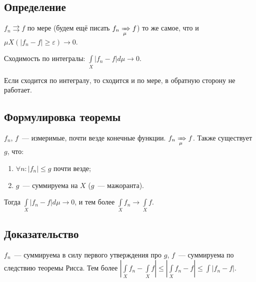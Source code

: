 \documentclass{article}
\begin{document}
        \subsection{Определение}
        
            $f_n \rightrightarrows f$ по мере (будем ещё писать $f_n \xRightarrow[\mu]{} f$) то же самое, что и $\mu X( |f_n - f| \geqslant \varepsilon) \rightarrow 0$. 
            
            Сходимость по интегралы: $\int\limits_X |f_n - f| d \mu \rightarrow 0$.
            
            Если сходится по интегралу, то сходится и по мере, в обратную сторону не работает.
        
        \subsection{Формулировка теоремы}
        
            $f_n$, $f$~--- измеримые, почти везде конечные функции. $f_n \xRightarrow[\mu]{} f$. Также существует $g$, что:
            
            \begin{enumerate}
            
                \item $\forall n : |f_n| \leqslant g$ почти везде;
                
                \item $g$~--- суммируема на $X$ ($g$~--- мажоранта).
                
            \end{enumerate}
        
            Тогда $\int\limits_X |f_n - f| d \mu \rightarrow 0$, и тем более $\int\limits_X f_n \rightarrow \int\limits_X f$.
            
        \subsection{Доказательство}
            
            $f_n$~--- суммируема в силу первого утверждения про $g$, $f$~--- суммируема по следствию теоремы Рисса. Тем более $\left| \int\limits_X f_n - \int\limits_X f \right| \leqslant \left| \int\limits_X f_n - f \right| \leqslant \int |f_n  - f|$.
                
\end{document}

